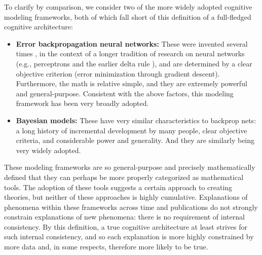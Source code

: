 \documentclass[11pt,twoside]{article}
\begin{document}
To clarify by comparison, we consider two of the more widely adopted cognitive
modeling frameworks, both of which fall short of this definition of a
full-fledged cognitive architecture:
\begin{itemize}
\item {\bf Error backpropagation neural networks:} These were invented several
  times \cite{BrysonHo69,Werbos74,RumelhartHintonWilliams86,RumelhartMcClelland86,
    McClellandRumelhart86}, in the context of a longer tradition of research
  on neural networks (e.g., perceptrons and the earlier delta rule
  ), and are
determined by a clear objective criterion (error minimization through gradient
descent).  Furthermore, the math is relative simple, and they are extremely
powerful and general-purpose.  Consistent with the above factors, this
modeling framework has been very broadly adopted.
\item {\bf Bayesian models:} These have very similar characteristics to
  backprop nets: a long history of incremental development by many people,
  clear objective criteria, and considerable power and generality.  And they
  are similarly being very widely adopted.
\end{itemize}

These modeling frameworks are so general-purpose and precisely mathematically
defined that they can perhaps be more properly categorized as mathematical
tools.  The adoption of these tools suggests a certain approach to creating
theories, but neither of these approaches is highly cumulative.  Explanations
of phenomena within these frameworks across time and publications do not
strongly constrain explanations of new phenomena: there is no requirement of
internal consistency.  By this definition, a true cognitive architecture at
least strives for such internal consistency, and so each explanation is more
highly constrained by more data and, in some respects, therefore more likely
to be true.

\end{document}

